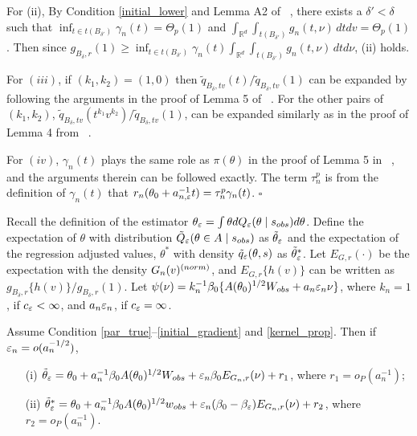 	For (ii), By Condition \ref{initial_lower} and Lemma A2 of ~\cite{Li2017}, there exists a $\delta'<\delta$
	such that $\inf_{t\in t(B_{\delta'})}\gamma_{n}(t)=\Theta_{p}(1)$
	and $\int_{\mathbb{R}^{d}}\int_{t(B_{\delta'})}g_{n}(t,\nu)\,dtdv=\Theta_{p}(1)$.
	Then since $g_{B_{\delta},r}(1)\geq\inf_{t\in t(B_{\delta'})}\gamma_{n}(t)\int_{\mathbb{R}^{d}}\int_{t(B_{\delta'})}g_{n}(t,\nu)\,dtd\nu$,
	(ii) holds.
	
	For $(iii)$, if $(k_1,k_2)=(1,0)$ then $\tilde{q}_{B_{\delta},tv}(t)/\tilde{q}_{B_{\delta},tv}(1)$
	can be expanded by following the arguments in the proof of Lemma 5
	of ~\cite{Li2016}. For the other pairs of $(k_1,k_2)$, $\tilde{q}_{B_{\delta},tv}(t^{k_{1}}v^{k_{2}})/\tilde{q}_{B_{\delta},tv}(1)$,
	can be expanded similarly as in the proof of Lemma 4 from ~\cite{Li2017}.
	
	For $(iv)$, $\gamma_{n}(t)$ plays the same role as $\pi(\theta)$
	in the proof of Lemma 5 in ~\cite{Li2016}, and the arguments therein
	can be followed exactly. The term $\tau_{n}^{p}$ is from the definition
	of $\gamma_{n}(t)$ that $r_{n}(\theta_0+a_{n,\veps}^{-1}t)=\tau_{n}^{p}\gamma_{n}(t)$.
	\hfill{$\square$} 
	
	

Recall the definition of the estimator $\theta_{\veps} = \int \theta dQ_{\veps}(\theta \mid s_{obs}) d\theta$. Define the expectation of $\theta$ with distribution $\tilde{Q}_{\veps}(\theta\in A\mid s_{\rm obs})$
as $\tilde{\theta}_{\veps}$ and the expectation of the regression adjusted values, $\theta^*$ 
with density $\tilde{q}_{\veps}(\theta,s)$ as $\tilde{\theta}_{\veps}^{*}$.
Let $E_{G,r}(\cdot)$ be the expectation with the density $G_{n}(v)^{({\rm norm})}$,
and $E_{G,r}\{h(v)\}$ can be written as $g_{B_{\delta},r}\{h(v)\}/g_{B_{\delta},r}(1)$.
Let $\psi(\nu)=k_{n}^{-1}\beta_{0}\{A(\theta_{0})^{1/2}W_{\rm obs}+a_{n}\veps_{n}\nu\}$,
where $k_{n}=1$, if $c_{\veps}<\infty$, and $a_{n}\veps_{n}$,
if $c_{\veps}=\infty$. 


\begin{lemma}\label{Alemma3} Assume Condition \ref{par_true}--\ref{initial_gradient} and \ref{kernel_prop}. Then if $\veps_{n}=o(a_{n}^{-1/2})$, 
	\begin{enumerate}
		\item[(i)] $\tilde{\theta}_{\veps}=\theta_{0}+a_{n}^{-1}\beta_{0}A(\theta_{0})^{1/2}W_{\rm obs}+\veps_{n}\beta_{0}E_{G_{n},r}(\nu)+r_{1}$,
		where $r_{1}=o_{P}(a_{n}^{-1})$; 
		\item[(ii)] $\tilde{\theta}_{\veps}^{*}=\theta_{0}+a_{n}^{-1}\beta_{0}A(\theta_{0})^{1/2}w_{\rm obs}+\veps_{n}(\beta_{0}-\beta_{\veps})E_{G_{n},r}(\nu)+r_{2}$,
		where $r_{2}=o_{P}(a_{n}^{-1})$. 
	\end{enumerate}\end{lemma}


